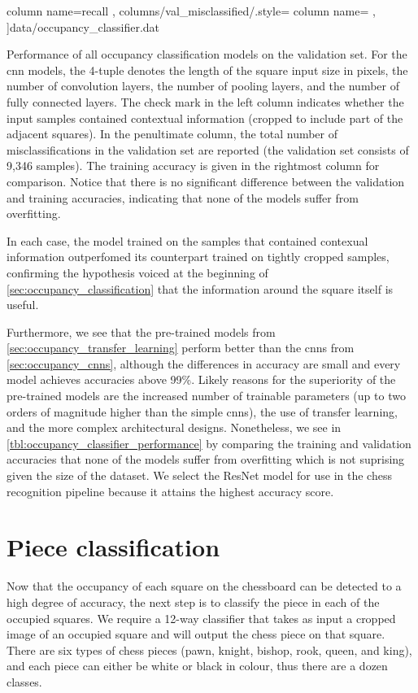 \documentclass[../main.tex]{subfiles}
\begin{document}
\begin{table}
{{                column name={recall}
            },
            columns/val_misclassified/.style={
                column name={}
            },
        ]{data/occupancy_classifier.dat}
    }
    \caption[Performance of all occupancy classification models on the validation set.]{
        Performance of all occupancy classification models on the validation set.
        For the \gls{cnn} models, the 4-tuple denotes the length of the square input size in pixels, the number of convolution layers, the number of pooling layers, and the number of fully connected layers.
        The check mark in the left column indicates whether the input samples contained contextual information (cropped to include part of the adjacent squares).
        In the penultimate column, the total number of misclassifications in the validation set are reported (the validation set consists of 9,346 samples).
        The training accuracy is given in the rightmost column for comparison.
        Notice that there is no significant difference between the validation and training accuracies, indicating that none of the models suffer from overfitting.
    }
    \label{tbl:occupancy_classifier_performance}
\end{table}
In each case, the model trained on the samples that contained contexual information outperfomed its counterpart trained on tightly cropped samples, confirming the hypothesis voiced at the beginning of \cref{sec:occupancy_classification} that the information around the square itself is useful.

Furthermore, we see that the pre-trained models from \cref{sec:occupancy_transfer_learning} perform better than the \glspl{cnn} from \cref{sec:occupancy_cnns}, although the differences in accuracy are small and every model achieves accuracies above 99\%.
Likely reasons for the superiority of the pre-trained models are the increased number of trainable parameters (up to two orders of magnitude higher than the simple \glspl{cnn}), the use of transfer learning, and the more complex architectural designs.
Nonetheless, we see in \cref{tbl:occupancy_classifier_performance} by comparing the training and validation accuracies that none of the models suffer from overfitting which is not suprising given the size of the dataset.
We select the ResNet model for use in the chess recognition pipeline because it attains the highest accuracy score.


\section{Piece classification}
\label{sec:piece_classification}
Now that the occupancy of each square on the chessboard can be detected to a high degree of accuracy, the next step is to classify the piece in each of the occupied squares.
We require a 12-way classifier that takes as input a cropped image of an occupied square and will output the chess piece on that square. 
There are six types of chess pieces (pawn, knight, bishop, rook, queen, and king), and each piece can either be white or black in colour, thus there are a dozen classes.
\end{document}

